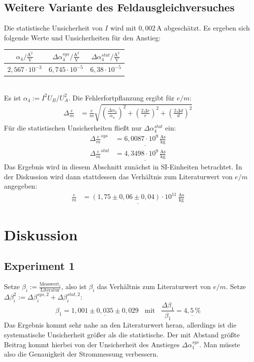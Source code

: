 \documentclass[a4paper,12pt]{article}
\newcommand{\kla}{}
\begin{document}
\subsection{Weitere Variante des Feldausgleichversuches}
Die statistische Unsicherheit von $I$ wird mit $0,002\,$A abgeschätzt. Es ergeben sich folgende Werte und Unsicherheiten für den Anstieg:
\begin{table}[h!]
\centering
\begin{tabular}{c|c|c}
$\alpha_4 / \frac{\mathrm{A}^2}{\mathrm{V}}$ & $\Delta \alpha_4^{sys} / \frac{\mathrm{A}^2}{\mathrm{V}}$ & $\Delta \alpha_4^{stat} / \frac{\mathrm{A}^2}{\mathrm{V}}$ \\ \hline
$2,567\cdot 10^{-3}$&$6,745\cdot 10^{-5}$&$6,38\cdot 10^{-5}$\\
\end{tabular}
\end{table}\\
Es ist $\alpha_4:=I^2U_B/U_A^2$. Die Fehlerfortpflanzung ergibt für $e/m$:
\begin{align*}
\Delta\frac{e}{m}&=\frac{e}{m}\sqrt{\kla\left( {\frac{\Delta\alpha_4}{\alpha_4}} \right)^2+\kla\left( \frac{2\Delta r}{r} \right)^2+\kla\left( {\frac{2\Delta d}{d}} \right)^2}
\end{align*}
Für die statistischen Unsicherheiten fließt nur $\Delta\alpha_4^{stat}$ ein:
\begin{align*}
\Delta\frac{e}{m}^{sys}&=\underline{6,0087\cdot 10^{9}\,\frac{\mathrm{As}}{\mathrm{kg}}}\\
\Delta\frac{e}{m}^{stat}&=\underline{4,3498\cdot 10^{9}\,\frac{\mathrm{As}}{\mathrm{kg}}}
\end{align*}
Das Ergebnis wird in diesem Abschnitt zunächst in SI-Einheiten betrachtet. In der Diskussion wird dann stattdessen das Verhältnis zum Literaturwert von $e/m$ angegeben:
\begin{align*}
\frac{e}{m}&=\underline{(1,75\pm 0,06\pm 0,04)\cdot 10^{11}\,\frac{\mathrm{As}}{\mathrm{kg}}}
\end{align*}
\section{Diskussion}
\subsection*{Experiment 1}
Setze $\beta_i:=\frac{\mathrm{Messwert}_i}{\mathrm{Literatur}}$, also ist $\beta_i$ das Verhältnis zum Literaturwert von $e/m$. Setze $\Delta\beta_i^2:=\Delta\beta_i^{sys,2}+\Delta\beta_i^{stat,2}$:
$$\beta_1=\underline{1,001\pm 0,035\pm 0,029}\ \ \ \ \mathrm{mit}\ \ \ \ \frac{\Delta\beta_1}{\beta_1}=\underline{4,5\,\text{\%}}$$
Das Ergebnis kommt sehr nahe an den Literaturwert heran, allerdings ist die systematische Unsicherheit größer als die statistische. Der mit Abstand größte Beitrag kommt hierbei von der Unsicherheit des Anstieges $\Delta\alpha_1^{sys}$. Man müsste also die Genauigkeit der Strommessung verbessern. 
\end{document}
